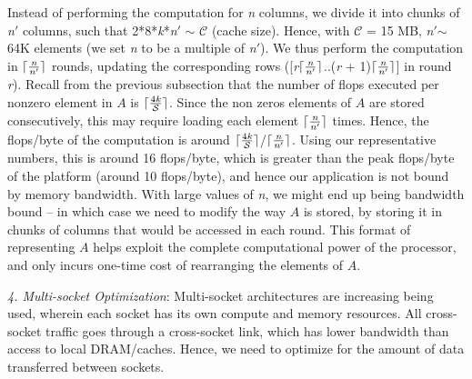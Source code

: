      Instead of performing the computation for {\it{n}} columns, we
     divide it into chunks of {\it{n}}$'$ columns, such that
     2*8*{\it{k}}*{\it{n}}$'$ $\sim$ $\mathcal{C}$ (cache size). Hence, with
     $\mathcal{C}$ = 15 MB,  {\it{n}}$'$$\sim$ 64K elements (we set
     {\it{n}} to be a multiple of {\it{n}}$'$). %
     We thus perform the computation in
     $\lceil\frac{\it{n}}{\it{n}'}\rceil$ rounds, 
     updating the corresponding rows
     ([{\it{r}}$\lceil\frac{\it{n}}{\it{n}'}\rceil$..({\it{r}} +
     1)$\lceil\frac{\it{n}}{\it{n}'}\rceil$]
     in round {\it{r}}).
     Recall from the previous subsection that the number of flops
     executed per nonzero element in $A$ is
     $\lceil\frac{4{\it{k}}}{\mathcal{S}}\rceil$.
     Since the non zeros elements of $A$ are stored consecutively, 
     this may require loading each element
     $\lceil\frac{\it{n}}{\it{n}'}\rceil$ times. Hence, the flops/byte
     of the computation is around
     $\lceil\frac{4{\it{k}}}{\mathcal{S}}\rceil$/$\lceil\frac{\it{n}}{\it{n}'}\rceil$.
     Using our representative numbers, this is around 16 flops/byte,
     which is greater than the peak flops/byte of the platform (around
     10 flops/byte), and
     hence our application is not bound by memory bandwidth. With
     large values of {\it{n}}, we might end up being bandwidth bound
     -- in which case we need to modify the way $A$ is stored, by
     storing it in chunks of columns that would be accessed in each
     round. This format of representing $A$  helps 
     exploit the complete computational power of the processor, 
     and only incurs
     one-time cost of rearranging  the elements of $A$.

     

     \vspace*{0.05in}
     {\it{4. Multi-socket Optimization}}: 
     Multi-socket architectures are increasing being used,
     wherein each socket has its own
     compute and memory resources. 
     All cross-socket traffic goes through a
     cross-socket link, which has lower bandwidth than access to local
     DRAM/caches. Hence, we need to optimize for the amount of data
     transferred between sockets. %

